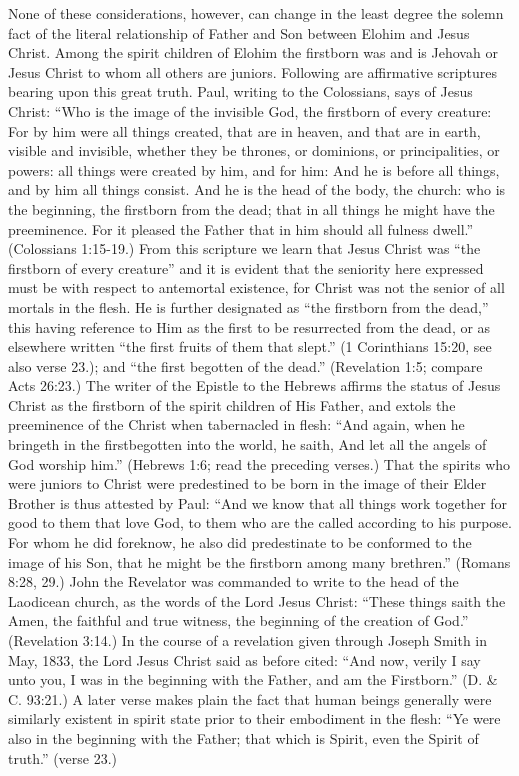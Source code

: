 None of these considerations, however, can change in the least degree the solemn fact of the
literal relationship of Father and Son between Elohim and Jesus Christ. Among the spirit
children of Elohim the firstborn was and is Jehovah or Jesus Christ to whom all others are
juniors. Following are affirmative scriptures bearing upon this great truth. Paul, writing to the
Colossians, says of Jesus Christ: ``Who is the image of the invisible God, the firstborn of
every creature: For by him were all things created, that are in heaven, and that are in earth,
visible and invisible, whether they be thrones, or dominions, or principalities, or powers: all
things were created by him, and for him: And he is before all things, and by him all things
consist. And he is the head of the body, the church: who is the beginning, the firstborn from
the dead; that in all things he might have the preeminence. For it pleased the Father that in
him should all fulness dwell.'' (Colossians 1:15-19.) From this scripture we learn that Jesus
Christ was ``the firstborn of every creature'' and it is evident that the seniority here expressed
must be with respect to antemortal existence, for Christ was not the senior of all mortals in
the flesh. He is further designated as ``the firstborn from the dead,'' this having reference to
Him as the first to be resurrected from the dead, or as elsewhere written ``the first fruits of
them that slept.'' (1 Corinthians 15:20, see also verse 23.); and ``the first begotten of the
dead.'' (Revelation 1:5; compare Acts 26:23.) The writer of the Epistle to the Hebrews
affirms the status of Jesus Christ as the firstborn of the spirit children of His Father, and
extols the preeminence of the Christ when tabernacled in flesh: ``And again, when he bringeth
in the firstbegotten into the world, he saith, And let all the angels of God worship him.''
(Hebrews 1:6; read the preceding verses.) That the spirits who were juniors to Christ were
predestined to be born in the image of their Elder Brother is thus attested by Paul: ``And we
know that all things work together for good to them that love God, to them who are the called
according to his purpose. For whom he did foreknow, he also did predestinate to be
conformed to the image of his Son, that he might be the firstborn among many brethren.''
(Romans 8:28, 29.) John the Revelator was commanded to write to the head of the Laodicean
church, as the words of the Lord Jesus Christ: ``These things saith the Amen, the faithful and
true witness, the beginning of the creation of God.'' (Revelation 3:14.) In the course of a
revelation given through Joseph Smith in May, 1833, the Lord Jesus Christ said as before
cited: ``And now, verily I say unto you, I was in the beginning with the Father, and am the
Firstborn.'' (D. \& C. 93:21.) A later verse makes plain the fact that human beings generally
were similarly existent in spirit state prior to their embodiment in the flesh: ``Ye were also in
the beginning with the Father; that which is Spirit, even the Spirit of truth.'' (verse 23.)


